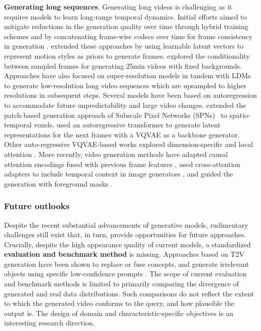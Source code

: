 \noindent
\textbf{Generating long sequences}. Generating long videos is challenging as it requires models to learn long-range temporal dynamics. Initial efforts aimed to mitigate reductions in the generation quality over time through hybrid training schemes  and by concatenating frame-wise codecs over time for frame consistency in generation .  extended these approaches by using learnable latent vectors to represent motion styles as priors to generate frames.  explored the conditionality between sampled frames for generating 25min videos with fixed backgrounds. Approaches  have also focused on super-resolution models in tandem with LDMs to generate low-resolution long video sequences which are upsampled to higher resolutions in subsequent steps. Several models have been based on autoregression to accommodate future unpredictability and large video changes.  extended the patch-based generation approach of Subscale Pixel Networks (SPNs)~ to spatio-temporal voxels.  used an autoregressive transformer to generate latent representations for the next frames with a VQVAE as a backbone generator. Other auto-regressive VQVAE-based works explored dimension-specific  and local attention . More recently, video generation methods have adapted causal attention encodings fused with previous frame features , used cross-attention adapters to include temporal context in image generators , and guided the generation with foreground masks .


\subsubsection{Future outlooks}
\label{sec:forecasting::generation:::outlooks}


Despite the recent substantial advancements of generative models, rudimentary challenges still exist that, in turn, provide opportunities for future approaches. Crucially, despite the high appearance quality of current models, a standardized \textbf{evaluation and benchmark method} is missing. Approaches based on T2V generation have been shown to replace or fuse concepts, and generate irrelevant objects using specific low-confidence prompts . The scope of current evaluation and benchmark methods  is limited to primarily comparing the divergence of generated and real data distributions. Such comparisons do not reflect the extent to which the generated video conforms to the query, and how plausible the output is. The design of domain and characteristic-specific objectives is an interesting research direction. 

